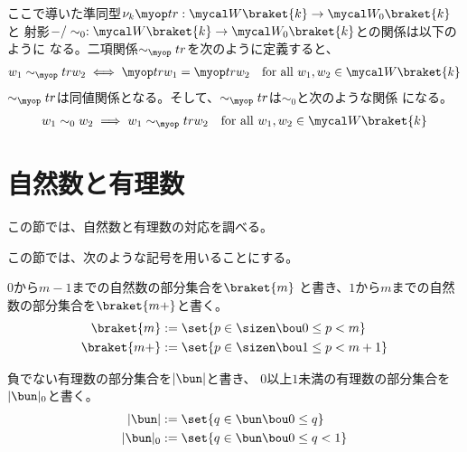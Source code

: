 	ここで導いた準同型$\nu_k\tr:\Word\braket{k}\to\Word_0\braket{k}$と
	射影$-/\sim_0:\Word\braket{k}\to\Word_0\braket{k}$との関係は以下のように
	なる。二項関係$\sim_\tr$を次のように定義すると、
	\begin{equation*}\begin{split}
		w_1\sim_\tr w_2 \iff \tr w_1 = \tr w_2
		\quad\text{for all }w_1,w_2\in\Word\braket{k}
	\end{split}\end{equation*}
	$\sim_\tr$は同値関係となる。そして、$\sim_\tr$は$\sim_0$と次のような関係
	になる。
	\begin{equation*}\begin{split}
		w_1\sim_0 w_2 \implies w_1\sim_\tr w_2
		\quad\text{for all }w_1,w_2\in\Word\braket{k}
	\end{split}\end{equation*}

\section{自然数と有理数}\label{s1:自然数と有理数} %
	この節では、自然数と有理数の対応を調べる。

	この節では、次のような記号を用いることにする。
	\begin{description}\setlength{\itemsep}{-1mm} %
		\item[自然数の部分集合] $0$から$m-1$までの自然数の部分集合を$\braket{m}$
		と書き、$1$から$m$までの自然数の部分集合を$\braket{m+}$と書く。
		\begin{equation*}\begin{split}
			\braket{m} &:= \set{p\in\sizen\bou 0\le p< m} \\
			\braket{m+} &:= \set{p\in\sizen\bou 1\le p< m + 1} \\
		\end{split}\end{equation*}
		\item[有理数の部分集合] 負でない有理数の部分集合を$|\bun|$と書き、
		$0$以上$1$未満の有理数の部分集合を$\bunsub$と書く。
		\begin{equation*}\begin{split}
			|\bun| &:= \set{q\in\bun\bou 0\le q} \\
			\bunsub &:= \set{q\in\bun\bou 0\le q < 1} \\
		\end{split}\end{equation*}
	\end{description} %
